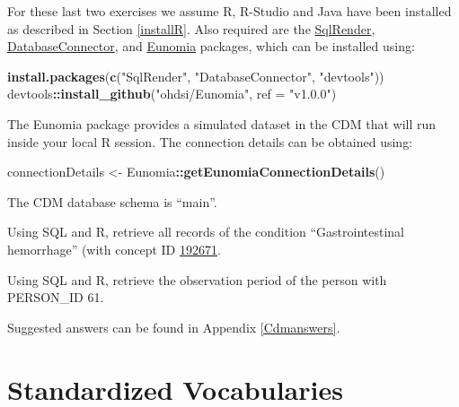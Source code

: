 \documentclass[11pt]{book}
\newenvironment{Shaded}{\begin{snugshade}}{\end{snugshade}}
\newcommand{\DataTypeTok}[1]{\textcolor[rgb]{0.13,0.29,0.53}{#1}}
\newcommand{\KeywordTok}[1]{\textcolor[rgb]{0.13,0.29,0.53}{\textbf{#1}}}
\newcommand{\NormalTok}[1]{#1}
\newcommand{\OperatorTok}[1]{\textcolor[rgb]{0.81,0.36,0.00}{\textbf{#1}}}
\newcommand{\StringTok}[1]{\textcolor[rgb]{0.31,0.60,0.02}{#1}}
\theoremstyle{definition}
\theoremstyle{definition}
\theoremstyle{definition}
\theoremstyle{remark}
\let\BeginKnitrBlock\begin \let\EndKnitrBlock\end
\begin{document}
For these last two exercises we assume R, R-Studio and Java have been installed as described in Section \ref{installR}. Also required are the \href{https://ohdsi.github.io/SqlRender/}{SqlRender}, \href{https://ohdsi.github.io/DatabaseConnector/}{DatabaseConnector}, and \href{https://ohdsi.github.io/Eunomia/}{Eunomia} packages, which can be installed using:

\begin{Shaded}
\begin{Highlighting}[]
\KeywordTok{install.packages}\NormalTok{(}\KeywordTok{c}\NormalTok{(}\StringTok{"SqlRender"}\NormalTok{, }\StringTok{"DatabaseConnector"}\NormalTok{, }\StringTok{"devtools"}\NormalTok{))}
\NormalTok{devtools}\OperatorTok{::}\KeywordTok{install_github}\NormalTok{(}\StringTok{"ohdsi/Eunomia"}\NormalTok{, }\DataTypeTok{ref =} \StringTok{"v1.0.0"}\NormalTok{)}
\end{Highlighting}
\end{Shaded}

The Eunomia package provides a simulated dataset in the CDM that will run inside your local R session. The connection details can be obtained using:

\begin{Shaded}
\begin{Highlighting}[]
\NormalTok{connectionDetails <-}\StringTok{ }\NormalTok{Eunomia}\OperatorTok{::}\KeywordTok{getEunomiaConnectionDetails}\NormalTok{()}
\end{Highlighting}
\end{Shaded}

The CDM database schema is ``main''.

\BeginKnitrBlock{exercise}
\protect\hypertarget{exr:exerciseGiBleedRecords}{}{\label{exr:exerciseGiBleedRecords} }Using SQL and R, retrieve all records of the condition ``Gastrointestinal hemorrhage'' (with concept ID \href{http://athena.ohdsi.org/search-terms/terms/192671}{192671}.
\EndKnitrBlock{exercise}

\BeginKnitrBlock{exercise}
\protect\hypertarget{exr:exercisePerson61Records}{}{\label{exr:exercisePerson61Records} }Using SQL and R, retrieve the observation period of the person with PERSON\_ID 61.
\EndKnitrBlock{exercise}

Suggested answers can be found in Appendix \ref{Cdmanswers}.

\hypertarget{StandardizedVocabularies}{%
\chapter{Standardized Vocabularies}\label{StandardizedVocabularies}}
\end{document}
